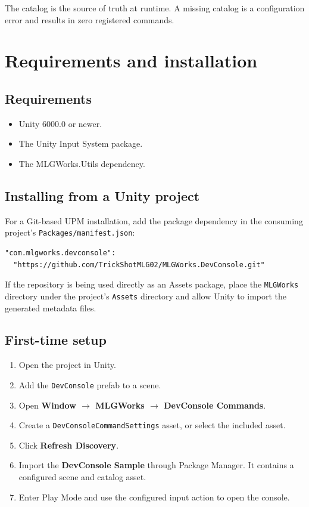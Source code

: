 \documentclass[11pt,a4paper]{article}
\begin{document}
\begin{important}
The catalog is the source of truth at runtime. A missing catalog is a configuration error and results in zero registered commands.
\end{important}

\section{Requirements and installation}

\subsection{Requirements}

\begin{itemize}[leftmargin=*]
  \item Unity 6000.0 or newer.
  \item The Unity Input System package.
  \item The MLGWorks.Utils dependency.
\end{itemize}

\subsection{Installing from a Unity project}

For a Git-based UPM installation, add the package dependency in the consuming project's \texttt{Packages/manifest.json}:

\begin{lstlisting}[style=csharp]
"com.mlgworks.devconsole":
  "https://github.com/TrickShotMLG02/MLGWorks.DevConsole.git"
\end{lstlisting}

If the repository is being used directly as an Assets package, place the \texttt{MLGWorks} directory under the project's \texttt{Assets} directory and allow Unity to import the generated metadata files.

\subsection{First-time setup}

\begin{enumerate}[leftmargin=*]
  \item Open the project in Unity.
  \item Add the \texttt{DevConsole} prefab to a scene.
  \item Open \textbf{Window $\rightarrow$ MLGWorks $\rightarrow$ DevConsole Commands}.
  \item Create a \texttt{DevConsoleCommandSettings} asset, or select the included asset.
  \item Click \textbf{Refresh Discovery}.
  \item Import the \textbf{DevConsole Sample} through Package Manager. It contains a configured scene and catalog asset.
  \item Enter Play Mode and use the configured input action to open the console.
\end{enumerate}
\end{document}
